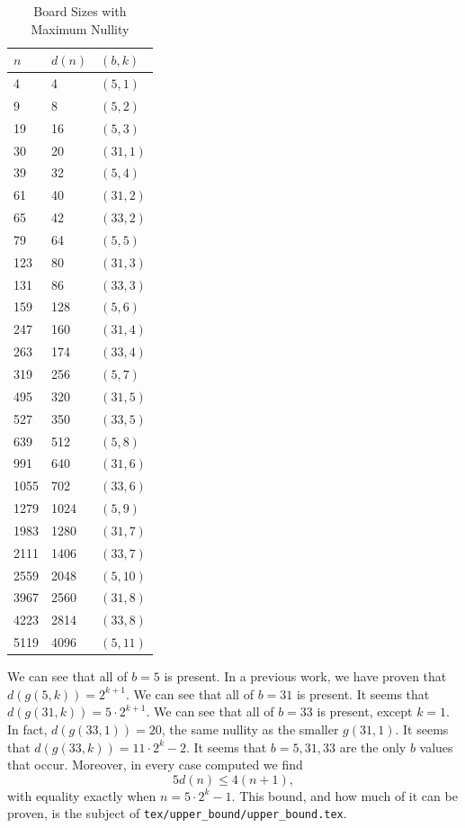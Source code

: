 \documentclass{article}
\begin{document}
	\begin{table}[H]
		\centering
		\begin{tabular}{|l|l|l|}
			\hline
			$n$ & $d(n)$ & $(b,k)$ \\
			\hline\hline
			4 & 4 & $(5,1)$ \\ 
			\hline
			9 & 8 & $(5,2)$ \\
			\hline
			19 & 16 & $(5,3)$ \\
			\hline
			30 & 20 & $(31,1)$ \\
			\hline
			39 & 32 & $(5,4)$ \\
			\hline
			61 & 40 & $(31,2)$ \\
			\hline
			65 & 42 & $(33,2)$ \\
			\hline
			79 & 64 & $(5,5)$ \\
			\hline
			123 & 80 & $(31,3)$ \\
			\hline
			131 & 86 & $(33,3)$ \\
			\hline
			159 & 128 & $(5,6)$ \\
			\hline
			247 & 160 & $(31,4)$ \\
			\hline
			263 & 174 & $(33,4)$ \\
			\hline
			319 & 256 & $(5,7)$ \\
			\hline
			495 & 320 & $(31,5)$ \\
			\hline
			527 & 350 & $(33,5)$ \\
			\hline
			639 & 512 & $(5,8)$ \\
			\hline
			991 & 640 & $(31,6)$ \\
			\hline
			1055 & 702 & $(33,6)$ \\
			\hline
			1279 & 1024 & $(5,9)$ \\
			\hline
			1983 & 1280 & $(31,7)$ \\
			\hline
			2111 & 1406 & $(33,7)$ \\
			\hline
			2559 & 2048 & $(5,10)$ \\
			\hline
			3967 & 2560 & $(31,8)$ \\
			\hline
			4223 & 2814 & $(33,8)$ \\
			\hline
			5119 & 4096 & $(5,11)$ \\
			\hline
		\end{tabular}
		\caption{Board Sizes with Maximum Nullity}
	\end{table}
	We can see that all of $b=5$ is present.
	In a previous work, we have proven that $d(g(5,k)) = 2^{k+1}$.
	We can see that all of $b=31$ is present.
	It seems that $d(g(31,k)) = 5\cdot2^{k+1}$.
	We can see that all of $b=33$ is present, except $k=1$.
	In fact, $d(g(33,1)) = 20$, the same nullity as the smaller $g(31,1)$.
	It seems that $d(g(33,k)) = 11\cdot2^{k} - 2$.
	It seems that $b=5,31,33$ are the only $b$ values that occur.
	Moreover, in every case computed we find
	\begin{equation*}
		5 d(n) \leq 4(n+1),
	\end{equation*}
	with equality exactly when $n = 5 \cdot 2^k - 1$.
	This bound, and how much of it can be proven, is the subject of \texttt{tex/upper\_bound/upper\_bound.tex}.
	
\end{document}
